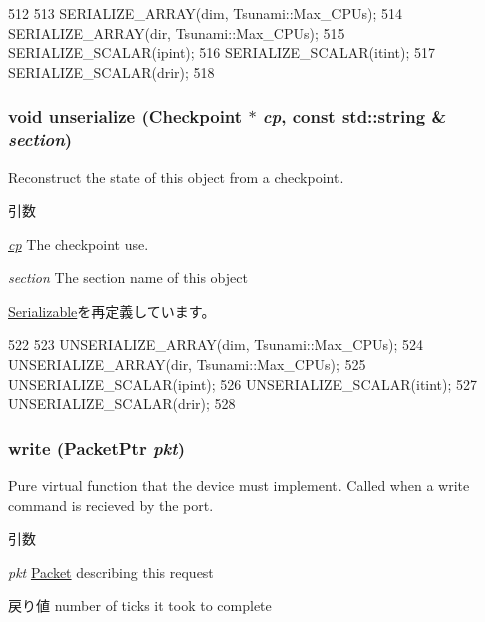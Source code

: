 \begin{DoxyCode}
512 {
513     SERIALIZE_ARRAY(dim, Tsunami::Max_CPUs);
514     SERIALIZE_ARRAY(dir, Tsunami::Max_CPUs);
515     SERIALIZE_SCALAR(ipint);
516     SERIALIZE_SCALAR(itint);
517     SERIALIZE_SCALAR(drir);
518 }
\end{DoxyCode}
\hypertarget{classTsunamiCChip_af22e5d6d660b97db37003ac61ac4ee49}{
\subsubsection[{unserialize}]{\setlength{\rightskip}{0pt plus 5cm}void unserialize ({\bf Checkpoint} $\ast$ {\em cp}, \/  const std::string \& {\em section})}}
\label{classTsunamiCChip_af22e5d6d660b97db37003ac61ac4ee49}
Reconstruct the state of this object from a checkpoint. 
\begin{DoxyParams}{引数}
\item[{\em \hyperlink{namespacecp}{cp}}]The checkpoint use. \item[{\em section}]The section name of this object \end{DoxyParams}


\hyperlink{classSerializable_af100c4e9feabf3cd918619c88c718387}{Serializable}を再定義しています。


\begin{DoxyCode}
522 {
523     UNSERIALIZE_ARRAY(dim, Tsunami::Max_CPUs);
524     UNSERIALIZE_ARRAY(dir, Tsunami::Max_CPUs);
525     UNSERIALIZE_SCALAR(ipint);
526     UNSERIALIZE_SCALAR(itint);
527     UNSERIALIZE_SCALAR(drir);
528 }
\end{DoxyCode}
\hypertarget{classTsunamiCChip_a4cefab464e72b5dd42c003a0a4341802}{
\subsubsection[{write}]{ write ({\bf PacketPtr} {\em pkt})}}
\label{classTsunamiCChip_a4cefab464e72b5dd42c003a0a4341802}
Pure virtual function that the device must implement. Called when a write command is recieved by the port. 
\begin{DoxyParams}{引数}
\item[{\em pkt}]\hyperlink{classPacket}{Packet} describing this request \end{DoxyParams}
\begin{DoxyReturn}{戻り値}
number of ticks it took to complete 
\end{DoxyReturn}


